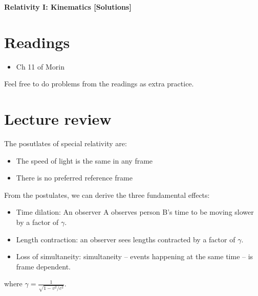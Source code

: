 \documentclass[11pt]{scrartcl}
\title{\titlee}
\author{Cambridge Physics Academy}
\date{2023-2024}
\newcommand{\titlee}{Relativity I: Kinematics [Solutions]}
\begin{document}
\thispagestyle{empty}
\begin{center}
    
    
    \Huge \textbf{\textsf{\titlee}}

    \large \theauthor
\end{center}

\setcounter{section}{-1}
\section{Readings}
\begin{itemize}
    \item Ch 11 of Morin
\end{itemize}
Feel free to do problems from the readings as extra practice.


\section{Lecture review}

\begin{defn}
    The posutlates of special relativity are:
    \begin{itemize}
        \item The speed of light is the same in any frame
        \item There is no preferred reference frame
    \end{itemize}
\end{defn}

\begin{theorem}
    From the postulates, we can derive the three fundamental effects:
    \begin{itemize}
        \item Time dilation: An observer A observes person B's time to be moving slower by a factor of $\gamma$.
        \item Length contraction: an observer sees lengths contracted by a factor of $\gamma$.
        \item Loss of simultaneity: simultaneity -- events happening at the same time -- is frame dependent.
    \end{itemize}
    where $\gamma = \frac{1}{\sqrt{1-v^2/c^2}}.$
\end{theorem}
\end{document}
